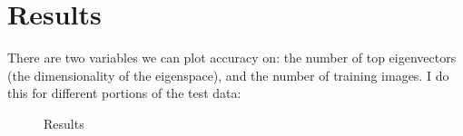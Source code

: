 \documentclass[11pt]{report}
\begin{document}
\section{Results}


There are two variables we can plot accuracy on: the number of top eigenvectors (the dimensionality of the eigenspace), and the number of training images. I do this for different portions of the test data:

\begin{figure}[h]
  \centering

  \caption{Results}
  \label{fig:results}
\end{figure}
\end{document}

